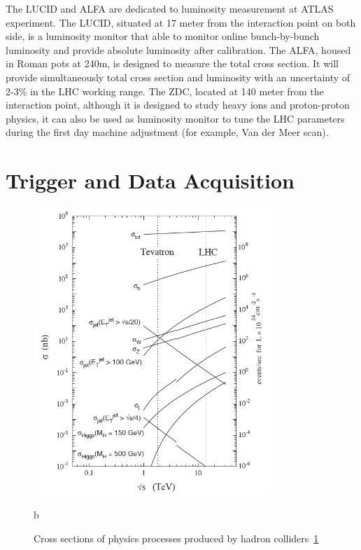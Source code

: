 \par The LUCID and ALFA are dedicated to luminosity measurement at ATLAS experiment. The LUCID, situated at 17 meter from the interaction point on both side, is a luminosity monitor that able to monitor online bunch-by-bunch luminosity and provide absolute luminosity after calibration. The ALFA, housed in Roman pots at 240m, is designed to measure the total cross section. It will provide simultaneously total cross section and luminosity with an uncertainty of 2-3\% in the LHC working range. The ZDC, located at 140 meter from the interaction point, although it is designed to study heavy ions and proton-proton physics, it can also be used as luminosity monitor to tune the LHC parameters during the first day machine adjustment (for example, Van der Meer scan).

\section{Trigger and Data Acquisition}
\label{sec:data}

\begin{figure}[htbp!]
 \centering
 \includegraphics[width=0.8\textwidth]{chapters/c4/figures/cross}
 \caption{b}
 \label{fig:cross}
 \caption{Cross sections of physics processes produced by hadron colliders~\ref{fig:cross}}
\end{figure}

